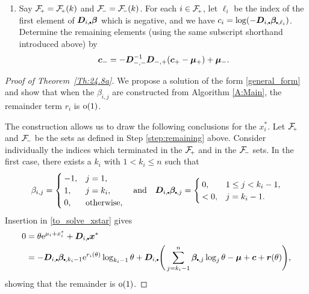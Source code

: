 \begin{pseudoalgorithm}
\begin{enumerate}
\item \label{step:remaining}Say $\Fset{+} = \Fset{+}(k)$ and $\Fset{-}
   = \Fset{-}(k)$. For each $i
  \in \Fset{+}$, let $\ell_i$ be the index of the first element of
  $\bfD_{i,\sbullet}  \bfbeta$ which is negative, and we have $c_i =
  \log(-\bfD_{i,\sbullet}  \bfbeta_{\sbullet,\ell_i})$. Determine the
  remaining elements (using the same subscript shorthand introduced above) by
\begin{equation} \label{consts}
	\bm{c}_{-} = -\bm{D}_{{-},{-}}^{-1} \bm{D}_{{-},{+}} (\bm{c}_{+} - \bm{\mu}_{+}) + \bm{\mu}_{-}  .
\end{equation}
\end{enumerate}
\end{pseudoalgorithm}

\begin{proof} [Proof of Theorem~{\rm \ref{Th:24.8a}}]
We propose a solution of the form \eqref{general_form} and show that when the
$\beta_{i,j}$ are constructed from Algorithm \ref{A:Main}, the remainder term
$r_i$ is ${\mathrm{o}}(1)$.

The construction allows us to draw the following conclusions for the
$x_i^*$. Let $\Fset{+}$ and $\Fset{-}$ be the sets as defined in Step
\ref{step:remaining} above.  Consider individually the indices which
terminated in the $\Fset{+}$ and in the $\Fset{-}$ sets. In the first case,
there exists a $k_i$ with $1 < k_i \leq n$ such that
\[
 \beta_{i,j} = \begin{cases}
	-1, & j = 1, \\
	1, & j = k_i, \\
	0, & \text{otherwise},
\end{cases} \quad \text{and} \quad \bfD_{i,\sbullet}  \bfbeta_{\sbullet,j} =
\begin{cases}
	0, & 1 \le j < k_i - 1, \\
	< 0, & j = k_i - 1.
\end{cases}
\]
Insertion in \eqref{to_solve_xstar} gives
\begin{align*} 0&=\theta \e^{\mu_i+x_i^*}+\bfD_{i,\sbullet}  \bfx^*\\
 & = -\bfD_{i,\sbullet}  \bfbeta_{\sbullet,k_i-1} \e^{r_i(\theta)} \log_{k_i-1} \theta
 +\bfD_{i,\sbullet} \Bigg( \sum_{j=k_i-1}^n\bfbeta_{\sbullet,j}\log_j \theta
 -\bfmu+\bfc+\bfr(\theta) \Bigg),
\end{align*}
showing that the remainder is ${\mathrm{o}}(1)$.


\end{proof}

